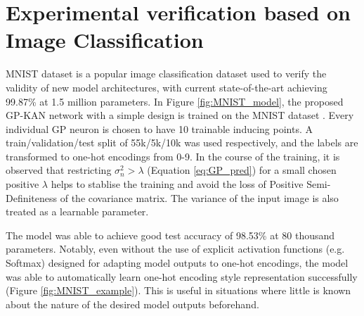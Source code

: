 \documentclass{article}
\begin{document}
\section{Experimental verification based on Image Classification}

MNIST dataset \cite{MNIST} is a popular image classification dataset used to verify the validity of new model architectures, with current state-of-the-art \cite{NoRoutingModel} achieving 99.87\% at 1.5 million parameters. In Figure \ref{fig:MNIST_model}, the proposed GP-KAN network with a simple design  is trained on the MNIST dataset \cite{MNIST}. Every individual GP neuron is chosen to have 10 trainable inducing points. A train/validation/test split of 55k/5k/10k was used respectively, and the labels are transformed to one-hot encodings from 0-9. In the course of the training, it is observed that restricting $\sigma_n^2 > \lambda$ (Equation \ref{eq:GP_pred}) for a small chosen positive $\lambda$ helps to stablise the training and avoid the loss of Positive Semi-Definiteness of the covariance matrix. The variance of the input image is also treated as a learnable parameter.

The model was able to achieve good test accuracy of 98.53\% at 80 thousand parameters. Notably, even without the use of explicit activation functions (e.g. Softmax) designed for adapting model outputs to one-hot encodings, the model was able to automatically learn one-hot encoding style representation successfully (Figure \ref{fig:MNIST_example}). This is useful in situations where little is known about the nature of the desired model outputs beforehand.
\end{document}
